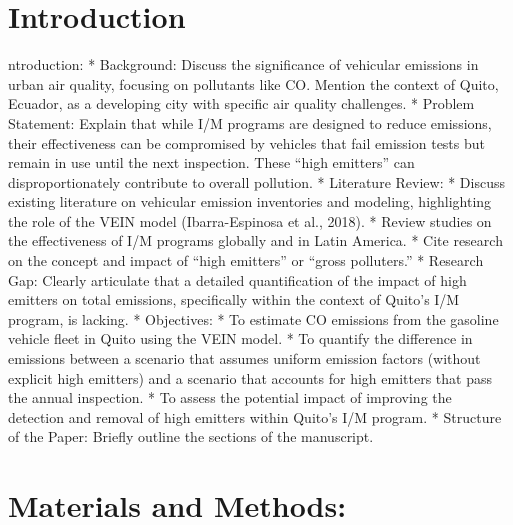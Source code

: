 \documentclass[atmosphere,article,submit,moreauthors,pdftex]{Definitions/mdpi}
\begin{document}

\section{Introduction}\label{introduction}

ntroduction: * Background: Discuss the significance of vehicular
emissions in urban air quality, focusing on pollutants like CO. Mention
the context of Quito, Ecuador, as a developing city with specific air
quality challenges. * Problem Statement: Explain that while I/M programs
are designed to reduce emissions, their effectiveness can be compromised
by vehicles that fail emission tests but remain in use until the next
inspection. These ``high emitters'' can disproportionately contribute to
overall pollution. * Literature Review: * Discuss existing literature on
vehicular emission inventories and modeling, highlighting the role of
the VEIN model (Ibarra-Espinosa et al., 2018). * Review studies on the
effectiveness of I/M programs globally and in Latin America. * Cite
research on the concept and impact of ``high emitters'' or ``gross
polluters.'' * Research Gap: Clearly articulate that a detailed
quantification of the impact of high emitters on total emissions,
specifically within the context of Quito's I/M program, is lacking. *
Objectives: * To estimate CO emissions from the gasoline vehicle fleet
in Quito using the VEIN model. * To quantify the difference in emissions
between a scenario that assumes uniform emission factors (without
explicit high emitters) and a scenario that accounts for high emitters
that pass the annual inspection. * To assess the potential impact of
improving the detection and removal of high emitters within Quito's I/M
program. * Structure of the Paper: Briefly outline the sections of the
manuscript.

\section{Materials and Methods:}\label{materials-and-methods}
\end{document}
